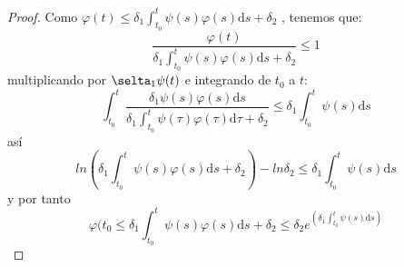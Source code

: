 \begin{proof}
Como $\varphi(t)\leq \delta_1\int_{t_0}^{t}\psi(s)\varphi(s)\mathrm{d}s +\delta_2$ , tenemos que:
$$
\frac{\varphi(t)}{\delta_1\int_{t_0}^{t}\psi(s)\varphi(s)\mathrm{d}s +\delta_2}\leq 1
$$
multiplicando por $\selta_1\psi(t)$ e integrando de $t_0$ a $t$:
$$
\int_{t_0}^{t}\frac{\delta_1\psi(s)\varphi(s)\mathrm{d}s}{\delta_1\int_{t_0}^{t}\psi(\tau)\varphi(\tau)\mathrm{d}\tau +\delta_2}\leq \delta_1\int_{t_0}^{t}\psi(s)\mathrm{d}s
$$
así
$$
ln(\delta_1\int_{t_0}^t\psi(s)\varphi(s)\mathrm{d}s+\delta_2)-ln\delta_2\leq\delta_1\int_{t_0}^t\psi(s)\mathrm{d}s
$$
y por tanto
$$
\varphi(t_0\leq\delta_1\int_{t_0}^t\psi(s)\varphi(s)\mathrm{d}s+\delta_2\leq\delta_2e^{(\delta_1\int_{t_0}^t\psi(s)\mathrm{d}s)}
$$
\end{proof}
